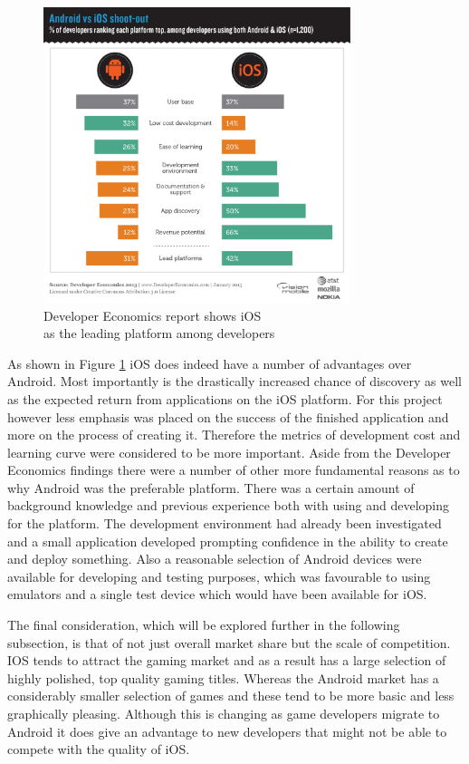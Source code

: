 \begin{figure}[H]
  \centering
   \includegraphics[width=0.8\textwidth]{Images/android_ios.png}
  \caption{Developer Economics report\cite{de} shows iOS\\as the leading platform among developers}
  \label{fig:de}
\end{figure}

As shown in Figure \ref{fig:de} iOS does indeed have a number of advantages over Android. Most importantly is the drastically increased chance of discovery as well as the expected return from applications on the iOS platform. For this project however less emphasis was placed on the success of the finished application and more on the process of creating it. Therefore the metrics of development cost and learning curve were considered to be more important. Aside from the Developer Economics findings there were a number of other more fundamental reasons as to why Android was the preferable platform. There was a certain amount of background knowledge and previous experience both with using and developing for the platform. The development environment had already been investigated and a small application developed prompting confidence in the ability to create and deploy something. Also a reasonable selection of Android devices were available for developing and testing purposes, which was favourable to using emulators and a single test device which would have been available for iOS.

The final consideration, which will be explored further in the following subsection, is that of not just overall market share but the scale of competition. IOS tends to attract the gaming market and as a result has a large selection of highly polished, top quality gaming titles. Whereas the Android market has a considerably smaller selection of games and these tend to be more basic and less graphically pleasing. Although this is changing as game developers migrate to Android it does give an advantage to new developers that might not be able to compete with the quality of iOS.


